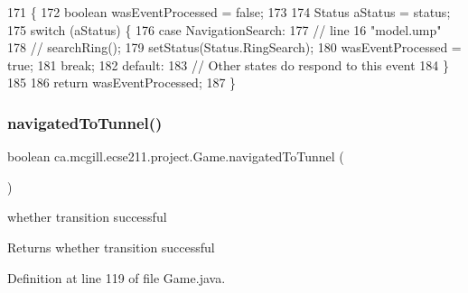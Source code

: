 \begin{DoxyCode}
171                                    \{
172     \textcolor{keywordtype}{boolean} wasEventProcessed = \textcolor{keyword}{false};
173 
174     Status aStatus = status;
175     \textcolor{keywordflow}{switch} (aStatus) \{
176       \textcolor{keywordflow}{case} NavigationSearch:
177         \textcolor{comment}{// line 16 "model.ump"}
178         \textcolor{comment}{// searchRing();}
179         setStatus(Status.RingSearch);
180         wasEventProcessed = \textcolor{keyword}{true};
181         \textcolor{keywordflow}{break};
182       \textcolor{keywordflow}{default}:
183         \textcolor{comment}{// Other states do respond to this event}
184     \}
185 
186     \textcolor{keywordflow}{return} wasEventProcessed;
187   \}
\end{DoxyCode}
\mbox{\label{enumca_1_1mcgill_1_1ecse211_1_1project_1_1_game_affc3685219c09f0a4a75cb1ea9366c8e}} 
\subsubsection{\texorpdfstring{navigated\+To\+Tunnel()}{navigatedToTunnel()}}
{\footnotesize\ttfamily boolean ca.\+mcgill.\+ecse211.\+project.\+Game.\+navigated\+To\+Tunnel (\begin{DoxyParamCaption}{ }\end{DoxyParamCaption})}

whether transition successful

\begin{DoxyReturn}{Returns}
whether transition successful 
\end{DoxyReturn}


Definition at line 119 of file Game.\+java.


